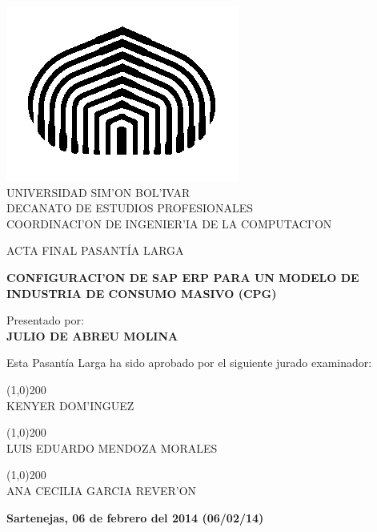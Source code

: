 \begin{titlepage}
\begin{center}

\includegraphics[scale=0.5,type=png,ext=.png,read=.png]{figures/cebolla} \\

\textsc {\large UNIVERSIDAD SIM'ON BOL'IVAR} \\
\textsc{DECANATO DE ESTUDIOS PROFESIONALES\\
COORDINACI'ON DE INGENIER'IA DE LA COMPUTACI'ON}

\bigskip
\bigskip
\bigskip
\bigskip
\bigskip
\bigskip

\textsc{ACTA FINAL PASANT\'IA LARGA}

\bigskip
\bigskip

\textsc{\bfseries CONFIGURACI'ON DE SAP ERP PARA UN MODELO DE INDUSTRIA DE CONSUMO MASIVO (CPG)}

\bigskip
\bigskip
\bigskip
\bigskip

\begin{minipage}{\textwidth}
\centering
Presentado por: \\
\textsc{\bfseries JULIO DE ABREU MOLINA} \\

\bigskip
\bigskip
\bigskip
\bigskip

Esta Pasant\'ia Larga ha sido aprobado por el siguiente jurado examinador: \\

\bigskip
\bigskip

\line(1,0){200} \\
KENYER DOM'INGUEZ\\

\bigskip
\bigskip

\line(1,0){200} \\
LUIS EDUARDO MENDOZA MORALES \\

\bigskip
\bigskip

\line(1,0){200} \\
ANA CECILIA GARCIA REVER'ON \\
\end{minipage}

\bigskip
\bigskip
\vfill

{\large \bfseries Sartenejas, 06 de febrero del 2014 (06/02/14)}

\end{center}
\end{titlepage}
